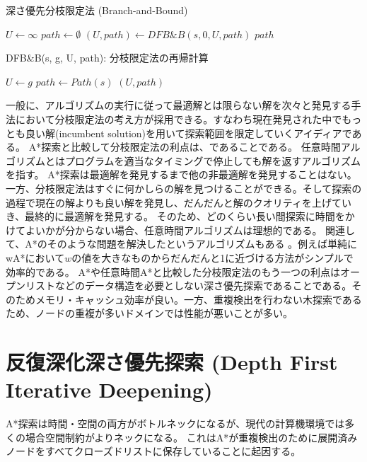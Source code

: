 \begin{algorithm}
\caption{深さ優先分枝限定法 (Branch-and-Bound)}
\label{alg:branch-and-bound}
	$U \leftarrow \infty$\;
	$path \leftarrow \emptyset$\;
	$(U, path) \leftarrow DFB\&B(s, 0, U, path)$\;
	\Return $path$\;
\end{algorithm}

\begin{algorithm}
\caption{DFB\&B(s, g, U, path): 分枝限定法の再帰計算}
\label{alg:branch-and-bound-rec}
	 {
		 {
			$U \leftarrow g$\;
			$path \leftarrow Path(s)$\;
		}
	}
        \Return $(U, path)$
\end{algorithm}

一般に、アルゴリズムの実行に従って最適解とは限らない解を次々と発見する手法において分枝限定法の考え方が採用できる。すなわち現在発見された中でもっとも良い解(incumbent solution)を用いて探索範囲を限定していくアイディアである。
A*探索と比較して分枝限定法の利点は、であることである。
任意時間アルゴリズムとはプログラムを適当なタイミングで停止しても解を返すアルゴリズムを指す。
A*探索は最適解を発見するまで他の非最適解を発見することはない。一方、分枝限定法はすぐに何かしらの解を見つけることができる。そして探索の過程で現在の解よりも良い解を発見し、だんだんと解のクオリティを上げていき、最終的に最適解を発見する。
そのため、どのくらい長い間探索に時間をかけてよいかが分からない場合、任意時間アルゴリズムは理想的である。
関連して、A*のそのような問題を解決したというアルゴリズムもある \cite{likhachev2004ara,hansen2007anytime,richter2010joy}。例えば単純にwA*において$w$の値を大きなものからだんだんと1に近づける方法がシンプルで効率的である。
A*や任意時間A*と比較した分枝限定法のもう一つの利点はオープンリストなどのデータ構造を必要としない深さ優先探索であることである。そのためメモリ・キャッシュ効率が良い。一方、重複検出を行わない木探索であるため、ノードの重複が多いドメインでは性能が悪いことが多い。


\section{反復深化深さ優先探索 (Depth First Iterative Deepening)}
\label{sec:depth-first-iterative-deepening}
A*探索は時間・空間の両方がボトルネックになるが、現代の計算機環境では多くの場合空間制約がよりネックになる。
これはA*が重複検出のために展開済みノードをすべてクローズドリストに保存していることに起因する。

